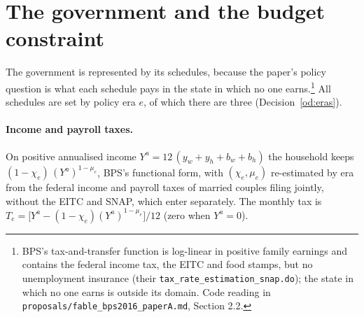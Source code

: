 \documentclass[11pt]{article}
\newcommand{\code}[1]{\texttt{#1}}
\newcommand{\1}{\mathbf{1}}
\begin{document}
\section{The government and the budget constraint}\label{sec:gov}

The government is represented by its schedules, because the paper's policy question is what each schedule pays in the
state in which no one earns.\footnote{BPS's tax-and-transfer function is log-linear in positive family earnings and
contains the federal income tax, the EITC and food stamps, but no unemployment insurance (their
\code{tax\_rate\_estimation\_snap.do}); the state in which no one earns is outside its domain. Code reading in
\code{proposals/fable\_bps2016\_paperA.md}, Section 2.2.} All schedules are set by policy era $e$, of which there
are three (Decision~\ref{od:eras}).

\paragraph{Income and payroll taxes.} On positive annualised income $Y^a = 12\,(y_w + y_h + b_w + b_h)$ the household
keeps $(1 - \chi_e)\,(Y^a)^{1 - \mu_e}$, BPS's functional form, with $(\chi_e, \mu_e)$ re-estimated by era from the
federal income and payroll taxes of married couples filing jointly, without the EITC and SNAP, which enter separately.
The monthly tax is $T_e = \big[Y^a - (1-\chi_e)(Y^a)^{1-\mu_e}\big]/12$ (zero when $Y^a = 0$).
\end{document}

